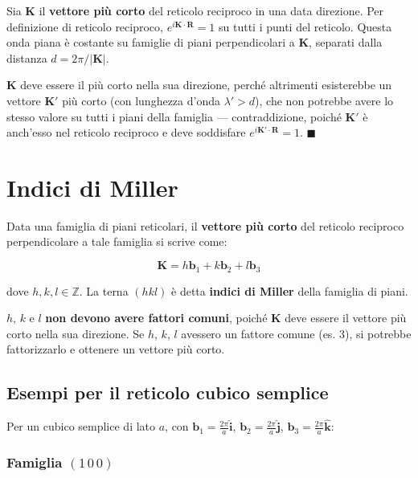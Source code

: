 Sia $\mathbf{K}$ il \textbf{vettore più corto} del reticolo reciproco in una data direzione. Per definizione di reticolo reciproco, $e^{i\mathbf{K} \cdot \mathbf{R}} = 1$ su tutti i punti del reticolo. Questa onda piana è costante su famiglie di piani perpendicolari a $\mathbf{K}$, separati dalla distanza $d = 2\pi/|\mathbf{K}|$.

$\mathbf{K}$ deve essere il più corto nella sua direzione, perché altrimenti esisterebbe un vettore $\mathbf{K}'$ più corto (con lunghezza d'onda $\lambda' > d$), che non potrebbe avere lo stesso valore su tutti i piani della famiglia — contraddizione, poiché $\mathbf{K}'$ è anch'esso nel reticolo reciproco e deve soddisfare $e^{i\mathbf{K}' \cdot \mathbf{R}} = 1$. $\blacksquare$

\section{Indici di Miller}

Data una famiglia di piani reticolari, il \textbf{vettore più corto} del reticolo reciproco perpendicolare a tale famiglia si scrive come:

\begin{equation}
\mathbf{K} = h\mathbf{b}_1 + k\mathbf{b}_2 + l\mathbf{b}_3
\end{equation}

dove $h, k, l \in \mathbb{Z}$. La terna $(hkl)$ è detta \textbf{indici di Miller} della famiglia di piani.

\begin{nota}
$h$, $k$ e $l$ \textbf{non devono avere fattori comuni}, poiché $\mathbf{K}$ deve essere il vettore più corto nella sua direzione. Se $h$, $k$, $l$ avessero un fattore comune (es. 3), si potrebbe fattorizzarlo e ottenere un vettore più corto.
\end{nota}

\subsection{Esempi per il reticolo cubico semplice}

Per un cubico semplice di lato $a$, con $\mathbf{b}_1 = \frac{2\pi}{a}\hat{\mathbf{i}}$, $\mathbf{b}_2 = \frac{2\pi}{a}\hat{\mathbf{j}}$, $\mathbf{b}_3 = \frac{2\pi}{a}\hat{\mathbf{k}}$:

\subsubsection{Famiglia $(1\,0\,0)$}

